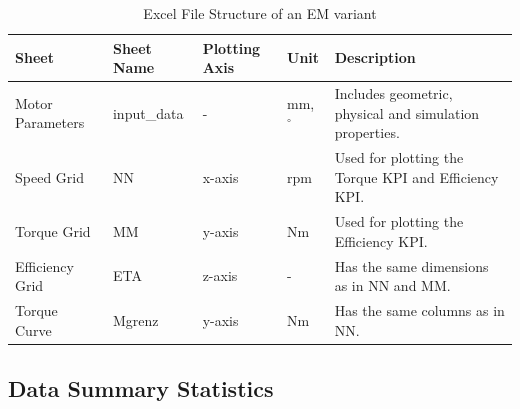 \documentclass{report} %
\begin{document}
\begin{table}[H]
    \centering
    \begin{tabular}{|p{1.7cm}|p{1.5cm}|p{1.3cm}|p{.7cm}|p{8.3cm}|}
    \hline
    {\bf Sheet} & {\bf Sheet Name} & {\bf Plotting Axis} & {\bf Unit} &  {\bf Description}\\
    \hline
    Motor Parameters & input\_data & - & mm, $^\circ$ & Includes geometric, physical and simulation properties.\\
    Speed Grid & NN & x-axis & rpm & Used for plotting the Torque \ac{KPI} and Efficiency \ac{KPI}.\\
    Torque Grid & MM & y-axis & Nm & Used for plotting the Efficiency \ac{KPI}.\\
    Efficiency Grid & ETA & z-axis & - & Has the same dimensions as in NN and MM. \\
    Torque Curve & Mgrenz & y-axis & Nm & Has the same columns as in NN. \\
    \hline
    \end{tabular}
    \caption{Excel File Structure of an \ac{EM} variant}
    \label{tab:Excel File Structure}
\end{table}

\subsection{Data Summary Statistics}
\label{subsec:Data Summary Statistics}
\end{document}
